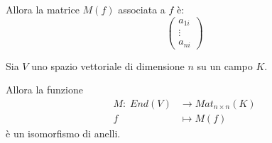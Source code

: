 \documentclass[../main.tex]{subfiles}
\begin{document}
Allora la matrice $M(f)$ associata a $f$ è:
\begin{equation*}
    \begin{pmatrix}
        a_{1i} \\
        \vdots \\
        a_{ni}
    \end{pmatrix}
\end{equation*}

\begin{theorem}
    Sia $V$ uno spazio vettoriale di dimensione $n$ su un campo $K$.

    Allora la funzione
    \begin{align*}
        M : \; End(V) & \rightarrow Mat_{n \times n}(K) \\
        f             & \mapsto M(f)
    \end{align*}
    è un isomorfismo di anelli.
\end{theorem}
\end{document}
